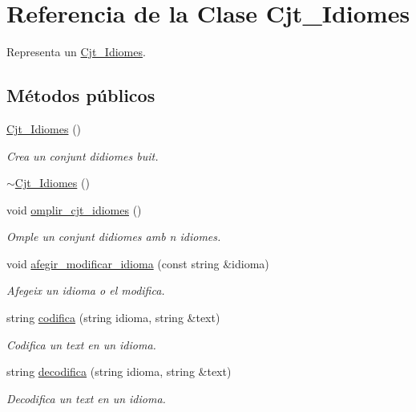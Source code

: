 \hypertarget{class_cjt___idiomes}{}\section{Referencia de la Clase Cjt\+\_\+\+Idiomes}
\label{class_cjt___idiomes}


Representa un \hyperlink{class_cjt___idiomes}{Cjt\+\_\+\+Idiomes}.  


\subsection*{Métodos públicos}
\begin{DoxyCompactItemize}
\item 
\hyperlink{class_cjt___idiomes_af77cbc534e3e83142a818314f5c24ae3}{Cjt\+\_\+\+Idiomes} ()
\begin{DoxyCompactList}\small\item\em Crea un conjunt d\textquotesingle{}idiomes buit. \end{DoxyCompactList}\item 
\hyperlink{class_cjt___idiomes_ab36517bd1824e0f00cab6cf724b6ad6f}{$\sim$\+Cjt\+\_\+\+Idiomes} ()
\item 
void \hyperlink{class_cjt___idiomes_a27ad0dd99449fffa904e6a757b4388ad}{omplir\+\_\+cjt\+\_\+idiomes} ()
\begin{DoxyCompactList}\small\item\em Omple un conjunt d\textquotesingle{}idiomes amb n idiomes. \end{DoxyCompactList}\item 
void \hyperlink{class_cjt___idiomes_a9e75f643c62886df635403bd3108c1df}{afegir\+\_\+modificar\+\_\+idioma} (const string \&idioma)
\begin{DoxyCompactList}\small\item\em Afegeix un idioma o el modifica. \end{DoxyCompactList}\item 
string \hyperlink{class_cjt___idiomes_a745de8e5d29e235cb1e2142d8acaaad9}{codifica} (string idioma, string \&text)
\begin{DoxyCompactList}\small\item\em Codifica un text en un idioma. \end{DoxyCompactList}\item 
string \hyperlink{class_cjt___idiomes_ab77062c4c2b311bbc1fc1143073bc036}{decodifica} (string idioma, string \&text)
\begin{DoxyCompactList}\small\item\em Decodifica un text en un idioma. \end{DoxyCompactList}\item 

\end{DoxyCompactItemize}
